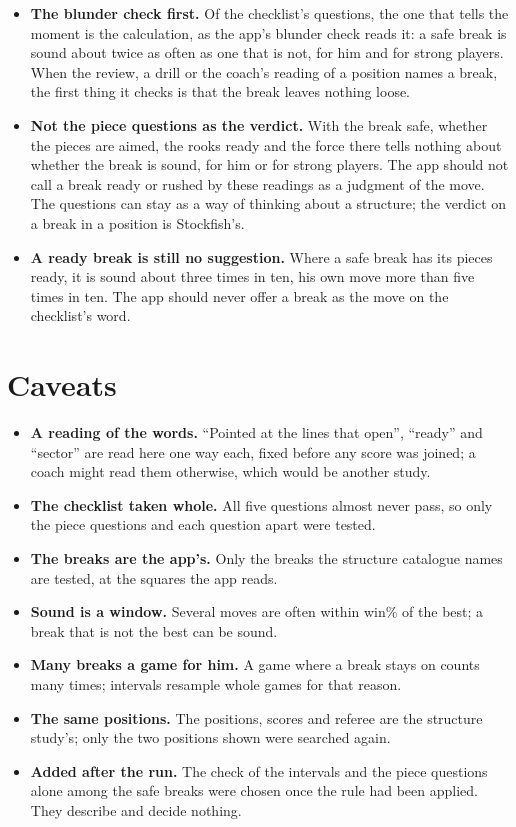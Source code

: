 \documentclass[11pt]{article}
\begin{document}
\begin{itemize}[nosep]
\item \textbf{The blunder check first.} Of the checklist's questions, the one that tells the
  moment is the calculation, as the app's blunder check reads it: a safe break is sound about
  twice as often as one that is not, for him and for strong players. When the review, a drill or
  the coach's reading of a position names a break, the first thing it checks is that the break
  leaves nothing loose.
\item \textbf{Not the piece questions as the verdict.} With the break safe, whether the pieces are
  aimed, the rooks ready and the force there tells nothing about whether the break is sound, for
  him or for strong players. The app should not call a break ready or rushed by these readings
  as a judgment of the move. The questions can stay as a way of thinking about a structure; the
  verdict on a break in a position is Stockfish's.
\item \textbf{A ready break is still no suggestion.} Where a safe break has its pieces ready, it
  is sound about three times in ten, his own move more than five times in ten. The app should
  never offer a break as the move on the checklist's word.
\end{itemize}

\section{Caveats}

\begin{itemize}[nosep]
\item \textbf{A reading of the words.} ``Pointed at the lines that open'', ``ready'' and
  ``sector'' are read here one way each, fixed before any score was joined; a coach might read
  them otherwise, which would be another study.
\item \textbf{The checklist taken whole.} All five questions almost never pass, so only the piece
  questions and each question apart were tested.
\item \textbf{The breaks are the app's.} Only the breaks the structure catalogue names are tested,
  at the squares the app reads.
\item \textbf{Sound is a window.} Several moves are often within \Window{} win\% of the best; a
  break that is not the best can be sound.
\item \textbf{Many breaks a game for him.} A game where a break stays on counts many times;
  intervals resample whole games for that reason.
\item \textbf{The same positions.} The positions, scores and referee are the structure study's;
  only the two positions shown were searched again.
\item \textbf{Added after the run.} The check of the intervals and the piece questions alone among
  the safe breaks were chosen once the rule had been applied. They describe and decide nothing.
\end{itemize}
\end{document}
